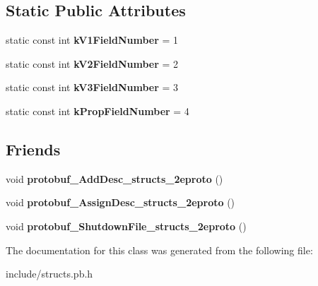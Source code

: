 \subsection*{Static Public Attributes}
\begin{DoxyCompactItemize}
\item 
\hypertarget{classstruct_definitions_1_1_triangle_face_ac38ffa3c5443555535322dad4e2d4674}{}\label{classstruct_definitions_1_1_triangle_face_ac38ffa3c5443555535322dad4e2d4674} 
static const int {\bfseries k\+V1\+Field\+Number} = 1
\item 
\hypertarget{classstruct_definitions_1_1_triangle_face_a07dd78289e54fee6a62c3b43759d9524}{}\label{classstruct_definitions_1_1_triangle_face_a07dd78289e54fee6a62c3b43759d9524} 
static const int {\bfseries k\+V2\+Field\+Number} = 2
\item 
\hypertarget{classstruct_definitions_1_1_triangle_face_a9f159e283a3b5ca0ea96571ad9f653ac}{}\label{classstruct_definitions_1_1_triangle_face_a9f159e283a3b5ca0ea96571ad9f653ac} 
static const int {\bfseries k\+V3\+Field\+Number} = 3
\item 
\hypertarget{classstruct_definitions_1_1_triangle_face_a1a5b8bcd2fe78be131a754eb60f5c1e9}{}\label{classstruct_definitions_1_1_triangle_face_a1a5b8bcd2fe78be131a754eb60f5c1e9} 
static const int {\bfseries k\+Prop\+Field\+Number} = 4
\end{DoxyCompactItemize}
\subsection*{Friends}
\begin{DoxyCompactItemize}
\item 
\hypertarget{classstruct_definitions_1_1_triangle_face_abcf9b7cc173b6d79696d01156751b8ce}{}\label{classstruct_definitions_1_1_triangle_face_abcf9b7cc173b6d79696d01156751b8ce} 
void {\bfseries protobuf\+\_\+\+Add\+Desc\+\_\+structs\+\_\+2eproto} ()
\item 
\hypertarget{classstruct_definitions_1_1_triangle_face_adb32752ff5178cb902966da6e3cb3bc6}{}\label{classstruct_definitions_1_1_triangle_face_adb32752ff5178cb902966da6e3cb3bc6} 
void {\bfseries protobuf\+\_\+\+Assign\+Desc\+\_\+structs\+\_\+2eproto} ()
\item 
\hypertarget{classstruct_definitions_1_1_triangle_face_ac2e4278d7604361fa6502b1cfbf9d980}{}\label{classstruct_definitions_1_1_triangle_face_ac2e4278d7604361fa6502b1cfbf9d980} 
void {\bfseries protobuf\+\_\+\+Shutdown\+File\+\_\+structs\+\_\+2eproto} ()
\end{DoxyCompactItemize}


The documentation for this class was generated from the following file\+:\begin{DoxyCompactItemize}
\item 
include/structs.\+pb.\+h\end{DoxyCompactItemize}
